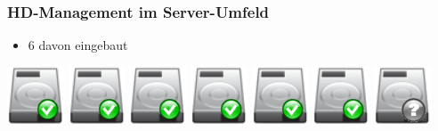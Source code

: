 \documentclass{beamer}
\begin{document}
  \frame
  {
    \frametitle{HD-Management im Server-Umfeld}

    \begin{itemize}
    \item{6 davon eingebaut}
    \end{itemize}

    \resizebox{40pt}{40pt}
    {
      \includegraphics{img/hdd_big_ok.png}
    }
    \resizebox{40pt}{40pt}
    {
      \includegraphics{img/hdd_big_ok.png}
    }
    \resizebox{40pt}{40pt}
    {
      \includegraphics{img/hdd_big_ok.png}
    }
    \resizebox{40pt}{40pt}
    {
      \includegraphics{img/hdd_big_ok.png}
    }
    \resizebox{40pt}{40pt}
    {
      \includegraphics{img/hdd_big_ok.png}
    }
    \resizebox{40pt}{40pt}
    {
      \includegraphics{img/hdd_big_ok.png}
    }
    \resizebox{40pt}{40pt}
    {
      \includegraphics{img/hdd_big_unknown.png}
    }
  }
\end{document}
